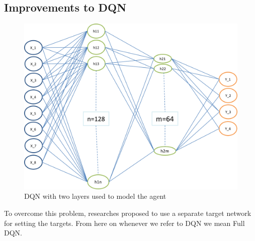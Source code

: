 \subsection{Improvements to DQN}



\begin{figure}[!ht]
\centering
\includegraphics[scale=0.35,width=0.35\columnwidth]{figures/NN.png}%
\caption{ DQN with two layers used to model the agent }%
\label{fig:Visualization}%
\end{figure}

To overcome this problem, researches proposed to use a separate target network for setting the targets. From here on whenever we refer to DQN we mean Full DQN.


